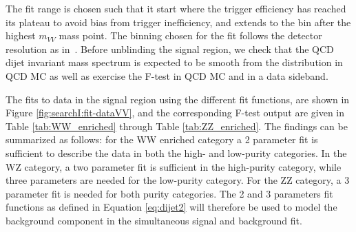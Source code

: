 The fit range is chosen such that it start where the trigger efficiency has reached its plateau to avoid bias from trigger inefficiency, and extends to the bin after the highest $m_{VV}$ mass point. The binning chosen for the fit follows the detector resolution as in~\cite{Chatrchyan:2012ypy,CMS-PAS-EXO-12-059}. Before unblinding the signal region, we check that the QCD dijet invariant mass spectrum is expected to be smooth from the distribution in QCD MC as well as exercise the F-test in QCD MC and in a data sideband.\par
The fits to data in the signal region using the different fit functions, are shown in Figure \ref{fig:searchI:fit-dataVV}, and the corresponding F-test output are given in Table \ref{tab:WW_enriched} through Table \ref{tab:ZZ_enriched}. The findings can be summarized as follows: for the WW enriched category a 2 parameter fit is sufficient to describe the data in both the high- and low-purity categories. In the WZ category, a two parameter fit is sufficient in the high-purity category, while three parameters are needed for the low-purity category. For the ZZ category, a 3 parameter fit is needed for both purity categories. The 2 and 3 parameters fit functions as defined in Equation \ref{eq:dijet2} will therefore be used to model the background component in the simultaneous signal and background fit.
\par


